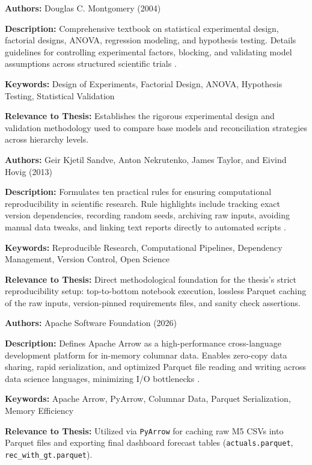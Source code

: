 {

	\textbf{Authors:}
	Douglas C. Montgomery (2004)

	\textbf{Description:}
	Comprehensive textbook on statistical experimental design, factorial designs, ANOVA, regression modeling, and hypothesis testing. Details guidelines for controlling experimental factors, blocking, and validating model assumptions across structured scientific trials \autocite{Montgomery:2004}.

	\textbf{Keywords:}
	Design of Experiments, Factorial Design, ANOVA, Hypothesis Testing, Statistical Validation

	\textbf{Relevance to Thesis:}
	Establishes the rigorous experimental design and validation methodology used to compare base models and reconciliation strategies across hierarchy levels.

}

{

	\textbf{Authors:}
	Geir Kjetil Sandve, Anton Nekrutenko, James Taylor, and Eivind Hovig (2013)

	\textbf{Description:}
	Formulates ten practical rules for ensuring computational reproducibility in scientific research. Rule highlights include tracking exact version dependencies, recording random seeds, archiving raw inputs, avoiding manual data tweaks, and linking text reports directly to automated scripts \autocite{Sandve:2013}.

	\textbf{Keywords:}
	Reproducible Research, Computational Pipelines, Dependency Management, Version Control, Open Science

	\textbf{Relevance to Thesis:}
	Direct methodological foundation for the thesis's strict reproducibility setup: top-to-bottom notebook execution, lossless Parquet caching of the raw inputs, version-pinned requirements files, and sanity check assertions.

}


{

	\textbf{Authors:}
	Apache Software Foundation (2026)

	\textbf{Description:}
	Defines Apache Arrow as a high-performance cross-language development platform for in-memory columnar data. Enables zero-copy data sharing, rapid serialization, and optimized Parquet file reading and writing across data science languages, minimizing I/O bottlenecks \autocite{ApacheArrow:2026}.

	\textbf{Keywords:}
	Apache Arrow, PyArrow, Columnar Data, Parquet Serialization, Memory Efficiency

	\textbf{Relevance to Thesis:}
	Utilized via \texttt{PyArrow} for caching raw M5 CSVs into Parquet files and exporting final dashboard forecast tables (\texttt{actuals.parquet}, \texttt{rec\_with\_gt.parquet}).

}


